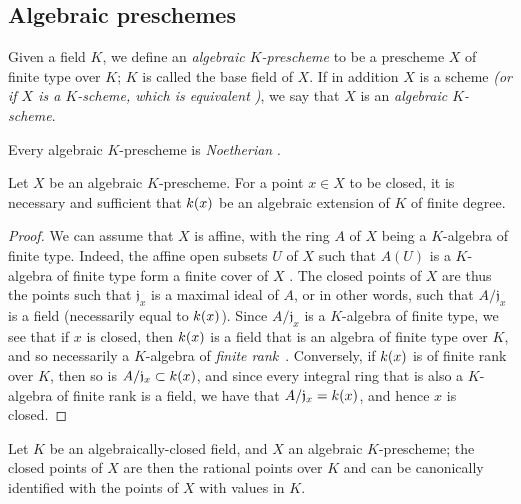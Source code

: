 \subsection{Algebraic preschemes}
\label{subsection:I.6.4}

\begin{definition}[6.4.1]
\label{I.6.4.1}
Given a field $K$, we define an \emph{algebraic $K$-prescheme} to be a prescheme $X$ of finite type over $K$; $K$ is called the base field of $X$.
If in addition $X$ is a scheme \emph{(or if $X$ is a \emph{$K$-scheme}, which is equivalent )}, we say that $X$ is an \emph{algebraic $K$-scheme}.
\end{definition}

Every algebraic $K$-prescheme is \emph{Noetherian} .

\begin{proposition}[6.4.2]
\label{I.6.4.2}
Let $X$ be an algebraic $K$-prescheme.
For a point $x\in X$ to be closed, it is necessary and sufficient that $k(x)$ be an algebraic extension of $K$ of finite degree.
\end{proposition}

\begin{proof}
\label{proof-I.6.4.2}
We can assume that $X$ is affine, with the ring $A$ of $X$ being a $K$-algebra of finite type.
Indeed, the affine open subsets $U$ of $X$ such that $A(U)$ is a $K$-algebra of finite type form a finite cover of $X$ .
The closed points of $X$ are thus the points such that $\mathfrak{j}_x$ is a
maximal ideal of $A$, or in other words, such that $A/\mathfrak{j}_x$ is a field (necessarily equal to $k(x)$).
Since $A/\mathfrak{j}_x$ is a $K$-algebra of finite type, we see that if $x$ is closed, then $k(x)$ is a field that is an algebra of finite type over $K$, and so necessarily a $K$-algebra of \emph{finite rank}~\cite{I-21}.
Conversely, if $k(x)$ is of finite rank over $K$, then so is $A/\mathfrak{j}_x\subset k(x)$, and since every integral ring that is also a $K$-algebra of finite rank is a field, we have that $A/\mathfrak{j}_x=k(x)$, and hence $x$ is closed.
\end{proof}

\begin{corollary}[6.4.3]
\label{I.6.4.3}
Let $K$ be an algebraically-closed field, and $X$ an algebraic $K$-prescheme; the closed points of $X$ are then the rational points over $K$  and can be canonically identified with the points of $X$ with values in $K$.
\end{corollary}


